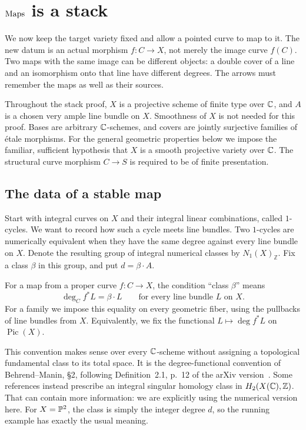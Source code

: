\chapter{\texorpdfstring{$\operatorname{Maps}$}{Stable maps} is a stack}\label{ch:maps}
\label{maps:chapter}

We now keep the target variety fixed and allow a pointed curve to map to it. The new datum is an actual morphism $f:C\to X$, not merely the image curve $f(C)$. Two maps with the same image can be different objects: a double cover of a line and an isomorphism onto that line have different degrees. The arrows must remember the maps as well as their sources.

Throughout the stack proof, $X$ is a projective scheme of finite type over $\mathbb C$, and $A$ is a chosen very ample line bundle on $X$. Smoothness of $X$ is not needed for this proof. Bases are arbitrary $\mathbb C$-schemes, and covers are jointly surjective families of \'etale morphisms. For the general geometric properties below we impose the familiar, sufficient hypothesis that $X$ is a smooth projective variety over $\mathbb C$. The structural curve morphism $C\to S$ is required to be of finite presentation.

\section{The data of a stable map}

\begin{Def}\label{maps:class}
Start with integral curves on $X$ and their integral linear combinations, called $1$-cycles. We want to record how such a cycle meets line bundles. Two $1$-cycles are numerically equivalent when they have the same degree against every line bundle on $X$. Denote the resulting group of integral numerical classes by $N_1(X)_{\mathbb Z}$. Fix a class $\beta$ in this group, and put $d=\beta\cdot A$.

For a map from a proper curve $f:C\to X$, the condition ``class $\beta$'' means
\[
 \deg_C f^*L=\beta\cdot L\qquad\text{for every line bundle }L\text{ on }X.
\]
For a family we impose this equality on every geometric fiber, using the pullbacks of line bundles from $X$. Equivalently, we fix the functional $L\mapsto\deg f^*L$ on $\operatorname{Pic}(X)$.
\end{Def}

This convention makes sense over every $\mathbb C$-scheme without assigning a topological fundamental class to its total space. It is the degree-functional convention of Behrend--Manin, \S2, following Definition~2.1, p.~12 of the arXiv version~\cite{BM}. Some references instead prescribe an integral singular homology class in $H_2(X(\mathbb C),\mathbb Z)$. That can contain more information: we are explicitly using the numerical version here. For $X=\mathbb P^2$, the class is simply the integer degree $d$, so the running example has exactly the usual meaning.

